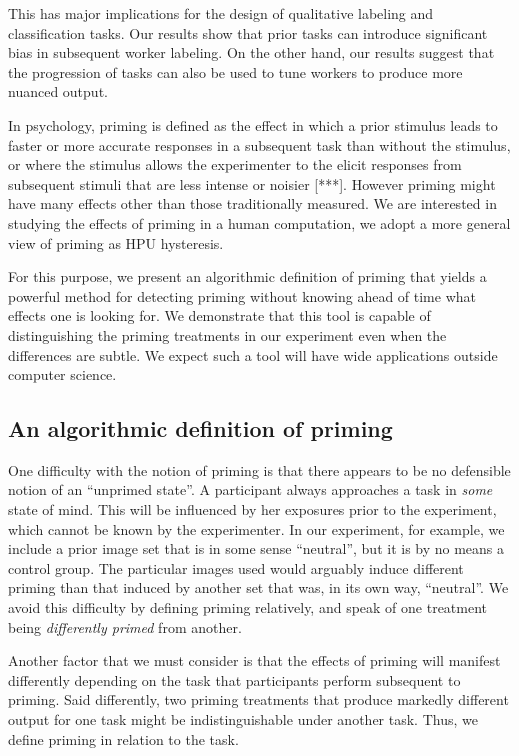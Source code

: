 \documentclass[a4paper]{report}
\begin{document}
This has major implications for the design of qualitative labeling and 
classification tasks.  Our results show that prior tasks can introduce 
significant bias in subsequent worker labeling.  On the other hand, our 
results suggest that the progression of tasks can also be used to tune 
workers to produce more nuanced output.

In psychology, priming is defined as the effect in which a prior stimulus leads
to faster or more accurate responses in a subsequent task than without the
stimulus, or where the stimulus allows the experimenter to the elicit 
responses from subsequent stimuli that are less intense or noisier [***].
However priming might have many effects other than those traditionally 
measured.  We are interested in studying the effects of priming in a human 
computation, we adopt a more general view of priming as HPU hysteresis.

For this purpose, we present an algorithmic definition of priming that
yields a powerful method for detecting priming without knowing ahead of time 
what effects one is looking for.  We demonstrate that this tool is capable of 
distinguishing the priming treatments in our experiment even when the 
differences are subtle.  We expect such a tool will have wide applications 
outside computer science.

\subsection*{An algorithmic definition of priming}

One difficulty with the notion of priming is that there appears to be no 
defensible notion of an ``unprimed state''.  A participant always approaches
a task in \textit{some} state of mind.  This will be influenced by her
exposures prior to the experiment, which cannot be known by the experimenter.  
In our experiment, for example, we include a prior image set that is in some
sense ``neutral'', but it is by no means a control group. The particular 
images used would arguably induce different priming than that induced by 
another set that was, in its own way, ``neutral''.
We avoid this difficulty by defining priming relatively, and speak of one
treatment being \textit{differently primed} from another.

Another factor that we must consider is that the effects of priming will
manifest differently depending on the task that participants perform 
subsequent to priming.  Said differently, two priming treatments that
produce markedly different output for one task might be 
indistinguishable under another task.  Thus, we define priming
in relation to the task.
\end{document}
